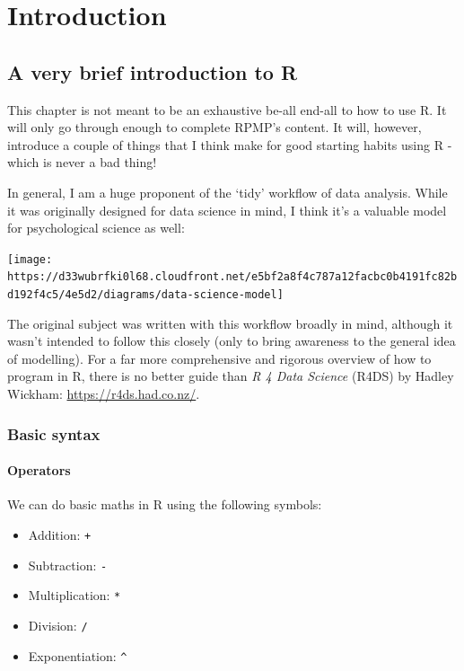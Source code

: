 \documentclass[
]{book}
\begin{document}
\part{Introduction}\label{part-introduction}

\chapter{A very brief introduction to R}\label{intro-to-R}

This chapter is not meant to be an exhaustive be-all end-all to how to use R. It will only go through enough to complete RPMP's content. It will, however, introduce a couple of things that I think make for good starting habits using R - which is never a bad thing!

In general, I am a huge proponent of the `tidy' workflow of data analysis. While it was originally designed for data science in mind, I think it's a valuable model for psychological science as well:

\begin{center}\texttt{[image: https://d33wubrfki0l68.cloudfront.net/e5bf2a8f4c787a12facbc0b4191fc82bd192f4c5/4e5d2/diagrams/data-science-model]} \end{center}

The original subject was written with this workflow broadly in mind, although it wasn't intended to follow this closely (only to bring awareness to the general idea of modelling). For a far more comprehensive and rigorous overview of how to program in R, there is no better guide than \emph{R 4 Data Science} (R4DS) by Hadley Wickham: \url{https://r4ds.had.co.nz/}.

\section{Basic syntax}\label{R-syntax}

\subsection{Operators}\label{operators}

We can do basic maths in R using the following symbols:

\begin{itemize}
\item
  Addition: \texttt{+}
\item
  Subtraction: \texttt{-}
\item
  Multiplication: \texttt{*}
\item
  Division: \texttt{/}
\item
  Exponentiation: \texttt{\^{}}
\end{itemize}
\end{document}
